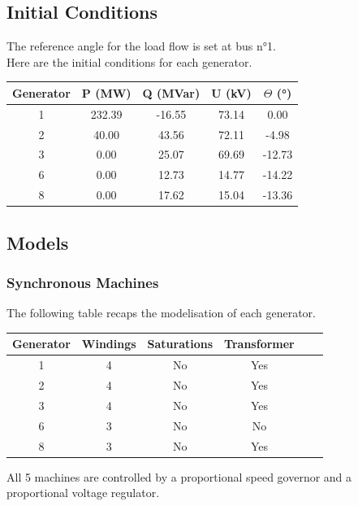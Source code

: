 \documentclass[a4paper, 12pt]{report}
\begin{document}
\subsection{Initial Conditions}

The reference angle for the load flow is set at bus n°1. \\

Here are the initial conditions for each generator.

\begin{center}
\begin{tabular}{|c|c|c|c|c|}
  \hline
  Generator & P (MW) & Q (MVar) & U (kV) & $\Theta$ (°) \\
  \hline
  1 & 232.39 & -16.55 & 73.14 & 0.00\\
  2 & 40.00 & 43.56 & 72.11 & -4.98\\
  3 & 0.00 & 25.07 & 69.69 & -12.73\\
  6 & 0.00 & 12.73 & 14.77 & -14.22\\
  8 & 0.00 & 17.62 & 15.04 & -13.36\\
  \hline
\end{tabular}
\end{center}

\subsection{Models}

\subsubsection{Synchronous Machines}

The following table recaps the modelisation of each generator.

\begin{center}
\begin{tabular}{|c|c|c|c|c|c|}
  \hline
  Generator & Windings  & Saturations & Transformer\\
  \hline
  1 & 4 & No & Yes\\
  2 & 4 & No & Yes\\
  3 & 4 & No & Yes\\
  6 & 3 & No & No\\
  8 & 3 & No & Yes\\
  \hline
\end{tabular}
\end{center}

All 5 machines are controlled by a proportional speed governor and a proportional voltage regulator. \\
\end{document}

